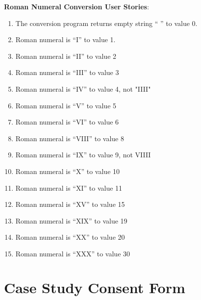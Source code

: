 \noindent \textbf{Roman Numeral Conversion User Stories}:
\begin{enumerate} 
  \item The conversion program returns empty string `` '' to value 0.
  \item Roman numeral is ``I'' to value 1.
  \item Roman numeral is ``II'' to value 2
  \item Roman numeral is ``III'' to value 3
  \item Roman numeral is ``IV'' to value 4, not "IIII"
  \item Roman numeral is ``V'' to value 5
  \item Roman numeral is ``VI'' to value 6
  \item Roman numeral is ``VIII'' to value 8
  \item Roman numeral is ``IX'' to value 9, not VIIII
  \item Roman numeral is ``X'' to value 10
  \item Roman numeral is ``XI'' to value 11
  \item Roman numeral is ``XV'' to value 15
  \item Roman numeral is ``XIX'' to value 19
  \item Roman numeral is ``XX'' to value 20
  \item Roman numeral is ``XXX'' to value 30 
\end{enumerate}

\chapter{Case Study Consent Form}
\label{app:CaseStudyConsentForm}

